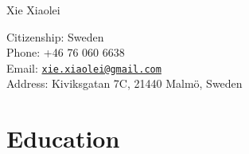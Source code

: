 \documentclass[10pt,letterpaper]{article}
\def\name{Xie Xiaolei}
\begin{document}
{\huge Xie Xiaolei}


\vspace{0.25in}

\begin{minipage}[t]{0.5\textwidth}
  Citizenship: Sweden \\
  Phone: +46 76 060 6638 \\
  Email: \href{mailto:xie.xiaolei@gmail.com}{\tt xie.xiaolei@gmail.com} \\
  Address: Kiviksgatan 7C, 21440 Malm\"{o}, Sweden
\end{minipage}

\section*{Education}
\end{document}

